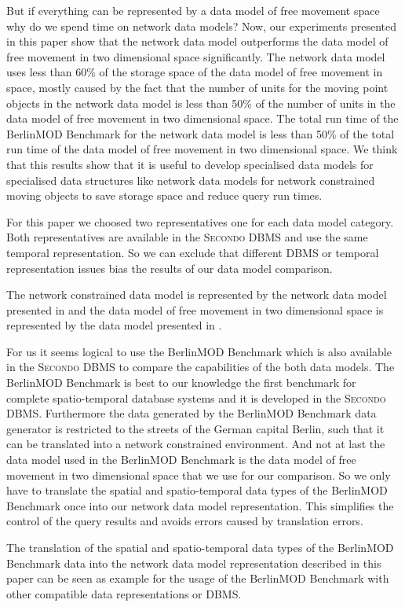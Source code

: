 \documentclass[a4paper]{article}
\newcommand{\secondo}{\textsc{Secondo}}
\newcommand{\bmodb} {BerlinMOD Benchmark}
\begin{document}
But if everything can be represented by a data model of free movement
space why do we spend time on network data models? Now, our experiments
presented in this paper show that the network data model outperforms the data model of
free movement in two dimensional space significantly. The network data model uses
less than 60\% of the storage space of the data model of free movement in space, mostly caused
by the fact that the number of units for the moving point objects in the network
data model is less than 50\% of the number of units in the data model of free
movement in two dimensional space. The total run time of the \bmodb{} for the
network data model is less than 50\% of the total run time of the data model of
free movement in two dimensional space. We think that this results show that
it is useful to develop specialised data models for specialised data structures
like network data models for network constrained moving objects to save storage
space and reduce query run times.

For this paper we choosed two representatives one for each data model category.
Both representatives are available in the \secondo{} DBMS and use the same
temporal representation. So we can exclude that different DBMS or temporal
representation issues bias the results of our data model comparison.

The network constrained data model is represented by
the network data model presented in \cite{1146465} and the data model of free
movement in two dimensional space is represented by the data model presented in
\cite{335426}.

For us it seems logical to use the \bmodb{} \cite{BerlinMODVLDB} which is also
available in the \secondo{} DBMS to compare the capabilities of the
both data models. The \bmodb{} is best to our knowledge the first benchmark for
complete spatio-temporal database systems and it is developed in the \secondo{}
DBMS. Furthermore the data generated by the \bmodb{} data generator is restricted
to the streets of the German capital Berlin, such that it can be translated into
a network constrained environment. And not at last the data model used in the
\bmodb{} is the data model of free movement in two dimensional space that we use
for our comparison. So we only have to translate the spatial and spatio-temporal
data types of the \bmodb{} once into our network data model representation.
This simplifies the control of the query results and avoids errors caused by
translation errors.

The translation of the spatial and spatio-temporal data types of the \bmodb{} data
into the network data model representation described in this paper can be seen as
example for the usage of the \bmodb{} with other compatible data representations or
DBMS.
\end{document}
